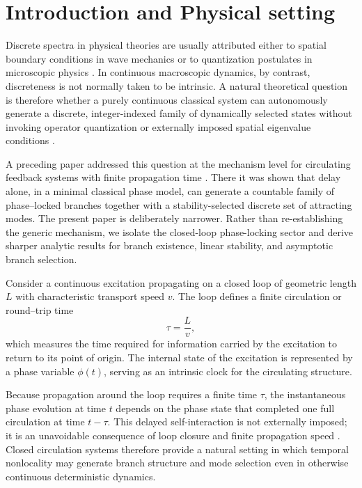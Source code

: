 \documentclass[11pt,a4paper]{article}
\begin{document}
    \par
    \noindent
    \normalfont\normalsize\justifying
    
    
    \section{Introduction and Physical setting}
        
        Discrete spectra in physical theories are usually attributed either to spatial boundary conditions in wave mechanics or to quantization postulates in microscopic physics \cite{Zettl2005,Griffiths2018}. In continuous macroscopic dynamics, by contrast, discreteness is not normally taken to be intrinsic. A natural theoretical question is therefore whether a purely continuous classical system can autonomously generate a discrete, integer-indexed family of dynamically selected states without invoking operator quantization or externally imposed spatial eigenvalue conditions \cite{Erneux2009,GlassMackey1988}.
        
        A preceding paper addressed this question at the mechanism level for circulating feedback systems with finite propagation time \cite{Iskandarani2026DelayModeSelection}. There it was shown that delay alone, in a minimal classical phase model, can generate a countable family of phase--locked branches together with a stability-selected discrete set of attracting modes. The present paper is deliberately narrower. Rather than re-establishing the generic mechanism, we isolate the closed-loop phase-locking sector and derive sharper analytic results for branch existence, linear stability, and asymptotic branch selection.
        
        Consider a continuous excitation propagating on a closed loop of geometric length $L$ with characteristic transport speed $v$. The loop defines a finite circulation or round--trip time
        \begin{equation}
            \tau = \frac{L}{v},
            \label{eq:tau}
        \end{equation}
        which measures the time required for information carried by the excitation to return to its point of origin. The internal state of the excitation is represented by a phase variable $\phi(t)$, serving as an intrinsic clock for the circulating structure.
        
        Because propagation around the loop requires a finite time $\tau$, the instantaneous phase evolution at time $t$ depends on the phase state that completed one full circulation at time $t-\tau$. This delayed self-interaction is not externally imposed; it is an unavoidable consequence of loop closure and finite propagation speed \cite{Hale1993,Diekmann1995,Erneux2009}. Closed circulation systems therefore provide a natural setting in which temporal nonlocality may generate branch structure and mode selection even in otherwise continuous deterministic dynamics.
        
\end{document}
